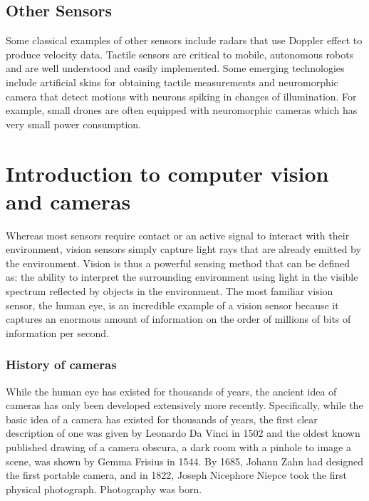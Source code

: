 \subsection{Other Sensors}

Some classical examples of other sensors include radars that use Doppler effect to produce velocity data. Tactile sensors are critical to mobile, autonomous robots and are well understood and easily implemented. Some emerging technologies include artificial skins for obtaining tactile measurements and neuromorphic camera that detect motions with neurons spiking in changes of illumination. For example, small drones are often equipped with neuromorphic cameras which has very small power consumption.


\section{Introduction to computer vision and cameras}
Whereas most sensors require contact or an active signal to interact with their environment, vision sensors simply capture light rays that are already emitted by the environment. Vision is thus a powerful sensing method that can be defined as: the ability to interpret the surrounding environment using light in the visible spectrum reflected by objects in the environment. The most familiar vision sensor, the human eye, is an incredible example of a vision sensor because it captures an enormous amount of information on the order of millions of bits of information per second.

\subsubsection{History of cameras}

While the human eye has existed for thousands of years, the ancient idea of cameras has only been developed extensively more recently. Specifically, while the basic idea of a camera has existed for thousands of years, the first clear description of one was given by Leonardo Da Vinci in 1502 and the oldest known published drawing of a camera obscura, a dark room with a pinhole to image a scene, was shown by Gemma Frisius in 1544. By 1685, Johann Zahn had designed the first portable camera, and in 1822, Joseph Nicephore Niepce took the first physical photograph. Photography was born.

